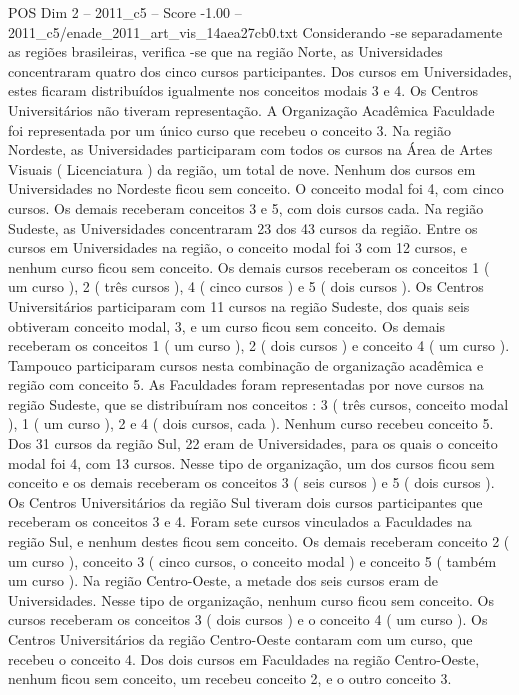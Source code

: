 \begin{textsample}{POS Dim 2 – 2011\_c5 – Score -1.00 – 2011\_c5/enade\_2011\_art\_vis\_14aea27cb0.txt}
Considerando -se separadamente as regiões brasileiras, verifica -se que na região Norte, as Universidades concentraram quatro dos cinco cursos participantes.
Dos cursos em Universidades, estes ficaram distribuídos igualmente nos conceitos modais 3 e 4.
Os Centros Universitários não tiveram representação.
A Organização Acadêmica Faculdade foi representada por um único curso que recebeu o conceito 3.
Na região Nordeste, as Universidades participaram com todos os cursos na Área de Artes Visuais ( Licenciatura ) da região, um total de nove.
Nenhum dos cursos em Universidades no Nordeste ficou sem conceito.
O conceito modal foi 4, com cinco cursos.
Os demais receberam conceitos 3 e 5, com dois cursos cada.
Na região Sudeste, as Universidades concentraram 23 dos 43 cursos da região.
Entre os cursos em Universidades na região, o conceito modal foi 3 com 12 cursos, e nenhum curso ficou sem conceito.
Os demais cursos receberam os conceitos 1 ( um curso ), 2 ( três cursos ), 4 ( cinco cursos ) e 5 ( dois cursos ).
Os Centros Universitários participaram com 11 cursos na região Sudeste, dos quais seis obtiveram conceito modal, 3, e um curso ficou sem conceito.
Os demais receberam os conceitos 1 ( um curso ), 2 ( dois cursos ) e conceito 4 ( um curso ).
Tampouco participaram cursos nesta combinação de organização acadêmica e região com conceito 5.
As Faculdades foram representadas por nove cursos na região Sudeste, que se distribuíram nos conceitos : 3 ( três cursos, conceito modal ), 1 ( um curso ), 2 e 4 ( dois cursos, cada ).
Nenhum curso recebeu conceito 5.
Dos 31 cursos da região Sul, 22 eram de Universidades, para os quais o conceito modal foi 4, com 13 cursos.
Nesse tipo de organização, um dos cursos ficou sem conceito e os demais receberam os conceitos 3 ( seis cursos ) e 5 ( dois cursos ).
Os Centros Universitários da região Sul tiveram dois cursos participantes que receberam os conceitos 3 e 4.
Foram sete cursos vinculados a Faculdades na região Sul, e nenhum destes ficou sem conceito.
Os demais receberam conceito 2 ( um curso ), conceito 3 ( cinco cursos, o conceito modal ) e conceito 5 ( também um curso ).
Na região Centro-Oeste, a metade dos seis cursos eram de Universidades.
Nesse tipo de organização, nenhum curso ficou sem conceito.
Os cursos receberam os conceitos 3 ( dois cursos ) e o conceito 4 ( um curso ).
Os Centros Universitários da região Centro-Oeste contaram com um curso, que recebeu o conceito 4.
Dos dois cursos em Faculdades na região Centro-Oeste, nenhum ficou sem conceito, um recebeu conceito 2, e o outro conceito 3.

\end{textsample}

